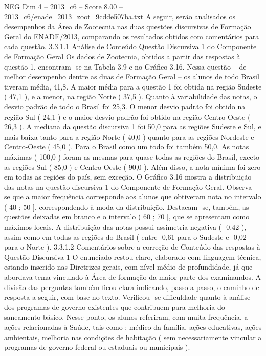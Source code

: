 \begin{textsample}{NEG Dim 4 – 2013\_c6 – Score 8.00 – 2013\_c6/enade\_2013\_zoot\_9cdde507ba.txt}
A seguir, serão analisados os desempenhos da Área de Zootecnia nas duas questões discursivas de Formação Geral do ENADE/2013, comparando os resultados obtidos com comentários para cada questão. 3.3.1.1 Análise de Conteúdo Questão Discursiva 1 do Componente de Formação Geral Os dados de Zootecnia, obtidos a partir das respostas à questão 1, encontram -se na Tabela 3.9 e no Gráfico 3.16.
Nessa questão – de melhor desempenho dentre as duas de Formação Geral – os alunos de todo Brasil tiveram média, 41,8.
A maior média para a questão 1 foi obtida na região Sudeste ( 47,1 ), e a menor, na região Norte ( 37,5 ).
Quanto à variabilidade das notas, o desvio padrão de todo o Brasil foi 25,3.
O menor desvio padrão foi obtido na região Sul ( 24,1 ) e o maior desvio padrão foi obtido na região Centro-Oeste ( 26,3 ).
A mediana da questão discursiva 1 foi 50,0 para as regiões Sudeste e Sul, e mais baixa tanto para a região Norte ( 40,0 ) quanto para as regiões Nordeste e Centro-Oeste ( 45,0 ).
Para o Brasil como um todo foi também 50,0.
As notas máximas ( 100,0 ) foram as mesmas para quase todas as regiões do Brasil, exceto as regiões Sul ( 85,0 ) e Centro-Oeste ( 90,0 ).
Além disso, a nota mínima foi zero em todas as regiões do país, sem exceção.
O Gráfico 3.16 mostra a distribuição das notas na questão discursiva 1 do Componente de Formação Geral.
Observa -se que a maior frequência corresponde aos alunos que obtiveram nota no intervalo ( 40 ; 50 ], correspondendo à moda da distribuição.
Destacam -se, também, as questões deixadas em branco e o intervalo ( 60 ; 70 ], que se apresentam como máximos locais.
A distribuição das notas possui assimetria negativa ( -0,42 ), assim como em todas as regiões do Brasil ( entre -0,61 para o Sudeste e -0,02 para o Norte ). 3.3.1.2 Comentários sobre a correção de Conteúdo das respostas à Questão Discursiva 1 O enunciado restou claro, elaborado com linguagem técnica, estando inserido nas Diretrizes gerais, com nível médio de profundidade, já que abordava tema vinculado à Área de formação da maior parte dos examinandos.
A divisão das perguntas também ficou clara indicando, passo a passo, o caminho de resposta a seguir, com base no texto.
Verificou -se dificuldade quanto à análise dos programas de governo existentes que contribuem para melhoria do saneamento básico.
Nesse ponto, os alunos referiram, com muita frequência, a ações relacionadas à Saúde, tais como : médico da família, ações educativas, ações ambientais, melhoria nas condições de habitação ( sem necessariamente vincular a programas de governo federal ou estaduais ou municipais ).

\end{textsample}
